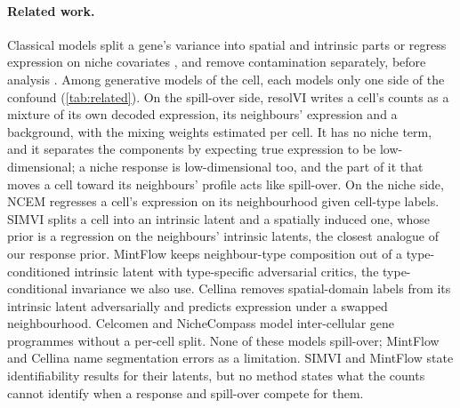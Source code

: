 \paragraph{Related work.}
\label{sec:related}
Classical models split a gene's variance into spatial and intrinsic parts \citep{svensson2018spatialde,arnol2019svca} or regress expression on niche covariates \citep{cable2022cside,tanevski2022misty}, and remove contamination separately, before analysis \citep{young2020soupx,fleming2023cellbender,petukhov2022baysor,mitchel2026celladmix}. Among generative models of the cell, each models only one side of the confound (\cref{tab:related}).
On the spill-over side, resolVI \citep{ergen2026resolvi} writes a cell's counts as a mixture of its own decoded expression, its neighbours' expression and a background, with the mixing weights estimated per cell. It has no niche term, and it separates the components by expecting true expression to be low-dimensional; a niche response is low-dimensional too, and the part of it that moves a cell toward its neighbours' profile acts like spill-over.
On the niche side, NCEM \citep{fischer2023} regresses a cell's expression on its neighbourhood given cell-type labels. SIMVI \citep{dong2025simvi} splits a cell into an intrinsic latent and a spatially induced one, whose prior is a regression on the neighbours' intrinsic latents, the closest analogue of our response prior. MintFlow \citep{akbarnejad2025mintflow} keeps neighbour-type composition out of a type-conditioned intrinsic latent with type-specific adversarial critics, the type-conditional invariance we also use. Cellina \citep{moeed2026cellina} removes spatial-domain labels from its intrinsic latent adversarially and predicts expression under a swapped neighbourhood. Celcomen \citep{megas2026celcomen} and NicheCompass \citep{birk2025nichecompass} model inter-cellular gene programmes without a per-cell split. None of these models spill-over; MintFlow and Cellina name segmentation errors as a limitation. SIMVI and MintFlow state identifiability results for their latents, but no method states what the counts cannot identify when a response and spill-over compete for them.

